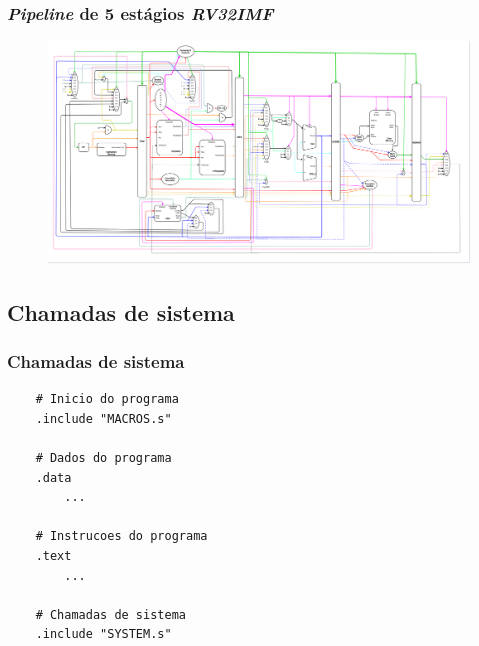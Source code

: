 \documentclass[aspectratio=169]{beamer}
\begin{document}
    \begin{frame}
        \frametitle{\textit{Pipeline} de 5 estágios \textit{RV32IMF}}
        \vfill
        \begin{figure}[H]
        \centering
            \includegraphics[width=.99\textwidth,height=.85\textheight,keepaspectratio]
            {../images/uarch_diagrams/pipeline-RV32IMF.png}
        \end{figure}
        \vfill
    \end{frame}

    \subsection{Chamadas de sistema}
    \begin{frame}[fragile]
        \frametitle{Chamadas de sistema}
        \vfill
        \begin{lstlisting}
    # Inicio do programa
    .include "MACROS.s"

    # Dados do programa
    .data
        ...

    # Instrucoes do programa
    .text
        ...

    # Chamadas de sistema
    .include "SYSTEM.s"
        \end{lstlisting}
        \vfill
    \end{frame}
\end{document}
